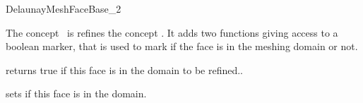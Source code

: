 \begin{ccRefConcept}{DelaunayMeshFaceBase_2}

\ccDefinition

The concept \ccRefName\ is refines the concept
  . It adds two functions giving access
  to a boolean marker, that is used to mark if the face is in the
  meshing domain or not.

\ccRefines
{}


\ccAccessFunctions

{ returns true if this face is in the domain to be refined..}

{ sets if this face is in the domain. }

\ccHasModels
{}

\end{ccRefConcept}

